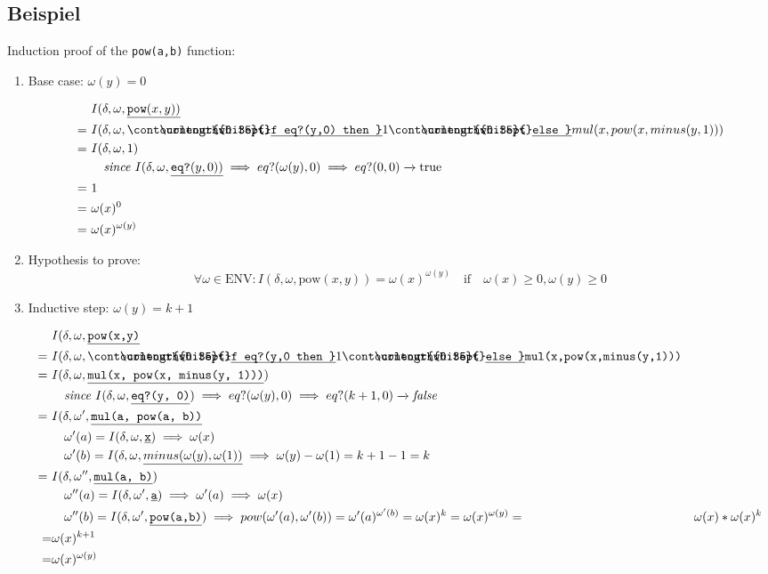 \documentclass[10pt, a4paper]{article}
\newcounter{bsp}
\newcommand{\task}{\stepcounter{bsp}\subsection*{Beispiel \arabic{bsp}}}
\newcommand{\ul}[1]{%
  \begingroup%
  \renewcommand{\ULdepth}{2.1pt}%
  \contourlength{0.35pt}%
  \uline{\phantom{#1}}\llap{\contour{white}{#1}}%
  \endgroup%
}
\newcommand{\Prog}[1]{\texttt{\ul{#1}}}
\newcommand{\ifThenElse}[3]{\Prog{if #1 then } #2 \Prog{ else } #3}
\begin{document}
\task
Induction proof of the \texttt{pow(a,b)} function: \\
\begin{enumerate}
    \item  Base case: $\omega(y) = 0 $

\begin{align*}
& I(\delta, \omega, \underline{\texttt{pow}(x, y))} \\
    = \ & I(\delta, \omega, \ifThenElse{eq?(y,0)}{1}{mul(x,pow(x,minus(y,1)))} \\
= \ & I(\delta, \omega, 1) \\
& \quad \textit{since } I(\delta, \omega, \underline{\texttt{eq?}(y, 0))} \implies eq?(\omega(y), 0) \implies eq?(0, 0) \xrightarrow{} \text{true} \\
= \ & 1 \\
= \ & \omega(x)^0 \\
= \ & \omega(x)^{\omega(y)}
\end{align*}

\item Hypothesis to prove: 
\[
\forall \omega \in \text{ENV} : 
I(\delta, \omega, \text{pow}(x, y)) = \omega(x)^{\omega(y)} 
\quad \text{if} \quad \omega(x) \geq 0, \omega(y) \geq 0
\]

\item Inductive step: $\omega(y) = k + 1$


\begin{align*}
& I(\delta, \omega, \underline{\texttt{pow(x,y)}}\\
= \ & I(\delta, \omega, \ifThenElse{eq?(y,0}{1}{\texttt{mul(x,pow(x,minus(y,1)))}} \\
= \ & I(\delta, \omega, \underline{\texttt{mul(x, pow(x, minus(y, 1)))}}) \\
& \quad \textit{since } I(\delta, \omega, \underline{\texttt{eq?(y, 0)}}) \implies eq?(\omega(y), 0) \implies eq?(k+1, 0) \xrightarrow{} \textit{false} \\
= \ & I(\delta, \omega', \underline{\texttt{mul(a, pow(a, b))}} \\
&\quad \omega'(a) = I(\delta, \omega, \underline{\texttt{{x}}}) \implies \omega(x) \\
&\quad \omega'(b) = I(\delta, \omega, \underline{minus(\omega(y), \omega(1))} \implies \omega(y) - \omega(1) = k + 1 -1 = k \\
= \ & I(\delta, \omega'', \underline{\texttt{mul(a, b)}}) \\
&\quad \omega''(a) = I(\delta, \omega', \underline{\texttt{a}}) \implies \omega'(a) \implies \omega(x) \\
&\quad \omega''(b) = I(\delta, \omega', \underline{\texttt{pow(a,b)}}) \implies pow(\omega'(a), \omega'(b)) = \omega'(a)^{\omega'(b)} = \omega(x)^k = \omega(x)^{\omega(y)}
= &\omega(x)*\omega(x)^k \\
=&\omega(x)^{k+1} \\
=&\omega(x)^{\omega(y)}
\end{align*}
\end{enumerate}
\end{document}

